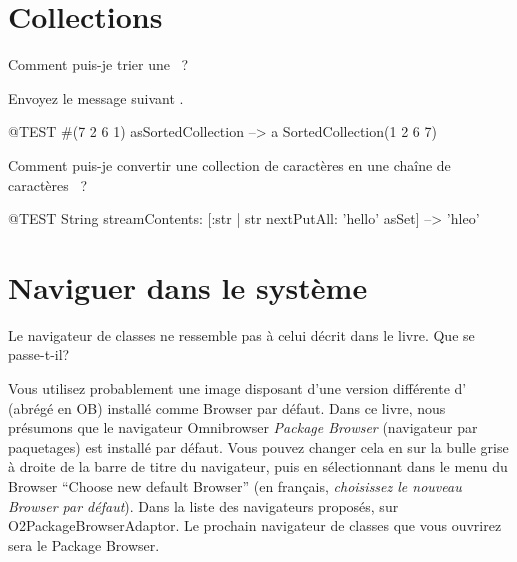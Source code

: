 \documentclass[a4paper,10pt,twoside]{book}
\begin{document}
\section{Collections}

\begin{faq}
Comment puis-je trier une ~?

\end{faq}
\answer
Envoyez le message suivant .

\begin{code}{@TEST}
#(7 2 6 1) asSortedCollection --> a SortedCollection(1 2 6 7)
\end{code}

\begin{faq}
Comment puis-je convertir une collection de caractères en une 
chaîne de caractères
~?
\end{faq}
\answer
\begin{code}{@TEST}
String streamContents: [:str | str nextPutAll: 'hello' asSet] --> 'hleo'
\end{code}

\section{Naviguer dans le système}

\begin{faq}
Le navigateur de classes ne ressemble pas à celui décrit dans le
livre. Que se passe-t-il?
\end{faq}
\answer
Vous utilisez probablement une image disposant d'une version
différente d'
(abrégé en OB) %
installé comme Browser par défaut.
Dans ce livre, nous présumons que le navigateur Omnibrowser
\emph{Package Browser} (navigateur par paquetages) est installé par
défaut.
Vous pouvez changer cela en \clickant sur la bulle grise 
à droite de la barre de titre du navigateur, puis en sélectionnant
dans le menu du Browser ``Choose new default Browser'' (en français,
\emph{choisissez le nouveau Browser par défaut}). Dans la liste des
navigateurs proposés, \clickz sur O2PackageBrowserAdaptor.
Le prochain navigateur de classes que vous ouvrirez sera le Package Browser. %
\end{document}
